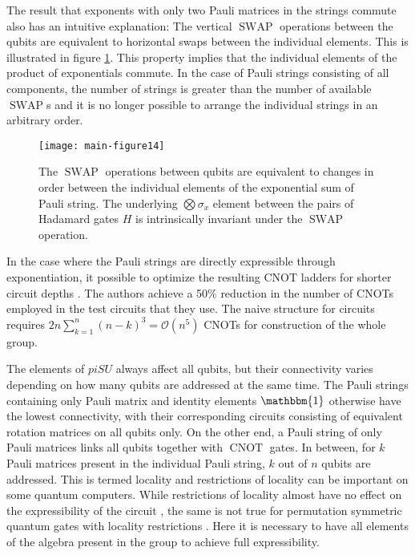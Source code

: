 \documentclass[%
 reprint,
 amsmath,amssymb,
 aps,
]{revtex4-2}
\newcommand{\SWAP}{\operatorname{SWAP}}
\newcommand{\CNOT}{\operatorname{CNOT}}
\theoremstyle{definition}%
\begin{document}
The result that exponents with only two Pauli matrices in the strings commute also has an intuitive explanation: The vertical $\operatorname{SWAP}$ operations between the qubits are equivalent to horizontal swaps between the individual elements. This is illustrated in figure \ref{fig:swaps}. This property implies that the individual elements of the product of exponentials commute. In the case of Pauli strings consisting of all components, the number of strings is greater than the number of available $\SWAP$s and it is no longer possible to arrange the individual strings in an arbitrary order.

\begin{figure}
    \centering
\texttt{[image: main-figure14]}

    \caption{The $\SWAP$ operations between qubits are equivalent to changes in order between the individual elements of the exponential sum of Pauli string. The underlying $\bigotimes \sigma_x$ element between the pairs of Hadamard gates $H$ is intrinsically invariant under the $\SWAP$ operation.}
    \label{fig:swaps}
\end{figure}

In the case where the Pauli strings are directly expressible through exponentiation, it possible to optimize the resulting CNOT ladders for shorter circuit depths \cite{cowtan_phase_2020}. The authors achieve a 50\% reduction in the number of CNOTs employed in the test circuits that they use. The naive structure for circuits requires $2n\sum_{k=1}^n (n-k)^3 = \mathcal{O}(n^5)$ CNOTs for construction of the whole group.

The elements of $piSU$ always affect all qubits, but their connectivity varies depending on how many qubits are addressed at the same time. The Pauli strings containing only Pauli matrix and identity elements $\mathbbm{1}$ otherwise have the lowest connectivity, with their corresponding circuits consisting of equivalent rotation matrices on all qubits only. On the other end, a Pauli string of only Pauli matrices links all qubits together with $\CNOT$ gates. In between, for $k$ Pauli matrices present in the individual Pauli string, $k$ out of $n$ qubits are addressed. This is termed locality and restrictions of locality can be important on some quantum computers. While restrictions of locality almost have no effect on the expressibility of the circuit \cite{divincenzo_two-bit_1995, lloyd_almost_1995}, the same is not true for permutation symmetric quantum gates with locality restrictions \cite{marvian_restrictions_2022,kazi_universality_2023}. Here it is necessary to have all elements of the algebra present in the group to achieve full expressibility. 
\end{document}
